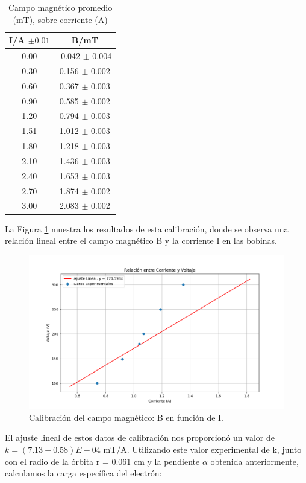 \documentclass[twocolumn,a4paper,11pt]{scrartcl}
\begin{document}
\begin{table}[h!]
\centering
\begin{tabular}{ |c| c | } 
\hline
I/A $\pm0.01$ & B/mT \\ 
\hline
0.00 & -0.042 $\pm$ 0.004 \\ 
0.30 & 0.156 $\pm$ 0.002 \\ 
0.60 & 0.367 $\pm$ 0.003 \\ 
0.90 & 0.585 $\pm$ 0.002 \\ 
1.20 & 0.794 $\pm$ 0.003 \\ 
1.51 & 1.012 $\pm$ 0.003 \\ 
1.80 & 1.218 $\pm$ 0.003 \\ 
2.10 & 1.436 $\pm$ 0.003 \\ 
2.40 & 1.653 $\pm$ 0.003 \\ 
2.70 & 1.874 $\pm$ 0.002 \\ 
3.00 & 2.083 $\pm$ 0.002 \\ 
\hline
\end{tabular}
\caption{Campo magnético promedio (mT), sobre corriente (A)}
\label{tabla:AT}
\end{table}


La Figura \ref{fig:B_vs_I} muestra los resultados de esta calibración, donde se observa una relación lineal entre el campo magnético B y la corriente I en las bobinas.

\begin{figure}[h]
    \centering
    \includegraphics[width=1\linewidth]{voltaje_vs_corriente.png}
    \caption{Calibración del campo magnético: B en función de I.}
    \label{fig:B_vs_I}
\end{figure}

El ajuste lineal de estos datos de calibración nos proporcionó un valor de $k =  (7.13 \pm 0.58) E-04$ mT/A. Utilizando este valor experimental de k, junto con el radio de la órbita r = 0.061 cm y la pendiente $\alpha$ obtenida anteriormente, calculamos la carga específica del electrón:
\end{document}

